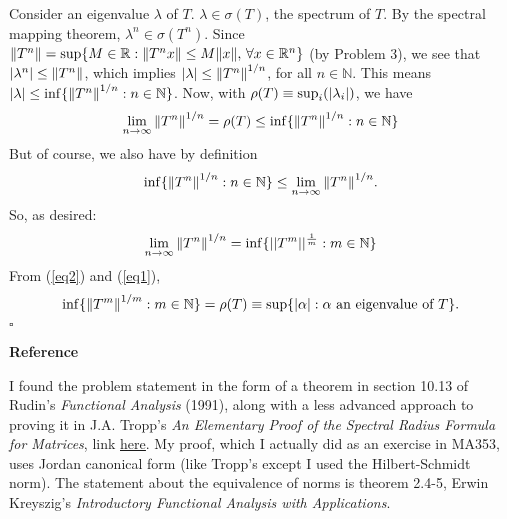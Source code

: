 \documentclass[11pt]{article}
\begin{document}
Consider an eigenvalue $\lambda$ of $T$. $\lambda \in \sigma(T)$, the spectrum of $T$. By the spectral mapping theorem, $\lambda^n \in \sigma(T^n)$. Since $\norm{T^n} = \sup \{ M \in \mathbb{R} : \norm{T^nx} \leq M\norm{x},\,\forall x\in \mathbb{R}^n \}$ (by Problem 3), we see that $\abs{\lambda^n} \leq \norm{T^n}$, which implies $\abs{\lambda} \leq \norm{T^n}^{1/n}$, for all $n\in \mathbb{N}$. This means $\abs{\lambda} \leq \inf \{ \norm{T^n}^{1/n} : n\in \mathbb{N} \}$. Now, with $\rho(T) \equiv \sup_i(\abs{\lambda_i})$, we have 
\begin{align*}
\lim\limits_{n\to \infty}\norm{T^n}^{1/n} =  \rho(T) \leq \inf \{ \norm{T^n}^{1/n} : n\in \mathbb{N} \}
\end{align*}
But of course, we also have by definition
\begin{align*}
\inf \{ \norm{T^n}^{1/n} : n\in \mathbb{N} \} \leq \lim\limits_{n\to \infty}\norm{T^n}^{1/n}.
\end{align*}
So, as desired:
\begin{align}\label{eq1}
\lim\limits_{n\to \infty}\norm{T^n}^{1/n} = \inf \{  || T^m || ^\frac{1}{m} : m \in \mathbb{N} \}
\end{align}
From (\ref{eq2}) and (\ref{eq1}), 
\begin{align*}
\inf \{ \norm{T^m}^{1/m} : m \in \mathbb{N}  \} = \rho(T) \equiv \sup\{ \abs{\alpha} : \alpha \text{ an eigenvalue of } T  \}.
\end{align*}
\hfill $\square$




\noindent \textbf{Reference}

I found the problem statement in the form of a theorem in section 10.13 of Rudin's \textit{Functional Analysis} (1991), along with a less advanced approach to proving it in J.A. Tropp's \textit{An Elementary Proof of the Spectral Radius Formula for Matrices}, link \href{https://pdfs.semanticscholar.org/0bb8/67b2a2cc8e2711bc3273e21db5acdbc06e4d.pdf}{\underline{here}}.  My proof, which I actually did as an exercise in MA353, uses Jordan canonical form (like Tropp's except I used the Hilbert-Schmidt norm). The statement about the equivalence of norms is theorem 2.4-5, Erwin Kreyszig's \textit{Introductory Functional Analysis with Applications}. 
\end{document}
